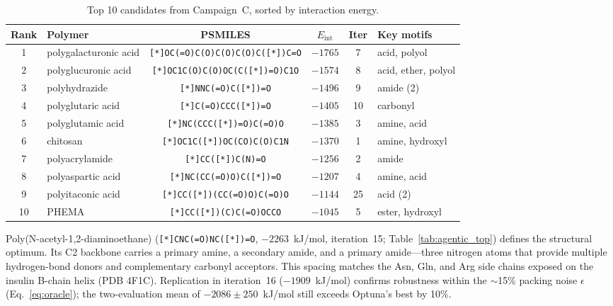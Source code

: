 \documentclass[twocolumn]{fairmeta}
\begin{document}
\begin{table}[t]
\centering
\caption{Top 10 candidates from Campaign~C, sorted by interaction energy.}
\label{tab:agentic_top_c}
\small
\begin{tabular}{clcccl}
\toprule
\textbf{Rank} & \textbf{Polymer} & \textbf{PSMILES} & \textbf{$E_\text{int}$} & \textbf{Iter} & \textbf{Key motifs} \\
\midrule
1  & polygalacturonic acid & \texttt{\footnotesize [*]OC(=O)C(O)C(O)C(O)C([*])C=O} & $-1765$ & 7 & acid, polyol \\
2  & polyglucuronic acid & \texttt{\footnotesize [*]OC1C(O)C(O)OC(C([*])=O)C1O} & $-1574$ & 8 & acid, ether, polyol \\
3  & polyhydrazide & \texttt{\footnotesize [*]NNC(=O)C([*])=O} & $-1496$ & 9 & amide (2) \\
4  & polyglutaric acid & \texttt{\footnotesize [*]C(=O)CCC([*])=O} & $-1405$ & 10 & carbonyl \\
5  & polyglutamic acid & \texttt{\footnotesize [*]NC(CCC([*])=O)C(=O)O} & $-1385$ & 3 & amine, acid \\
6  & chitosan & \texttt{\footnotesize [*]OC1C([*])OC(CO)C(O)C1N} & $-1370$ & 1 & amine, hydroxyl \\
7  & polyacrylamide & \texttt{\footnotesize [*]CC([*])C(N)=O} & $-1256$ & 2 & amide \\
8  & polyaspartic acid & \texttt{\footnotesize [*]NC(CC(=O)O)C([*])=O} & $-1207$ & 4 & amine, acid \\
9  & polyitaconic acid & \texttt{\footnotesize [*]CC([*])(CC(=O)O)C(=O)O} & $-1144$ & 25 & acid (2) \\
10 & PHEMA & \texttt{\footnotesize [*]CC([*])(C)C(=O)OCCO} & $-1045$ & 5 & ester, hydroxyl \\
\bottomrule
\end{tabular}
\end{table}

Poly(N-acetyl-1,2-diaminoethane) (\texttt{[*]CNC(=O)NC([*])=O}, $-2263$~kJ/mol, iteration~15; Table~\ref{tab:agentic_top}) defines the structural optimum.
Its C2 backbone carries a primary amine, a secondary amide, and a primary amide---three nitrogen atoms that provide multiple hydrogen-bond donors and complementary carbonyl acceptors.
This spacing matches the Asn, Gln, and Arg side chains exposed on the insulin B-chain helix (PDB 4F1C).
Replication in iteration~16 ($-1909$~kJ/mol) confirms robustness within the ${\sim}$15\% packing noise $\epsilon$ (Eq.~\ref{eq:oracle}); the two-evaluation mean of $-2086 \pm 250$~kJ/mol still exceeds Optuna's best by 10\%.
\end{document}
